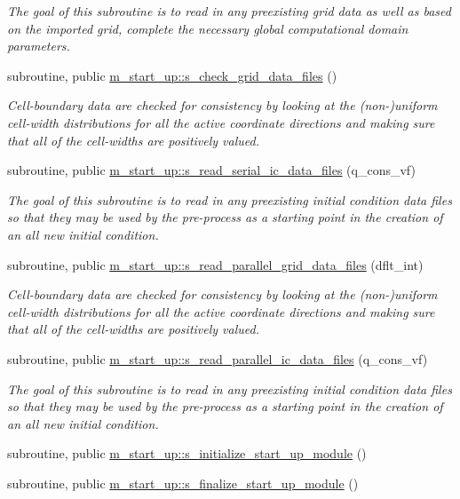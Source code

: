 \begin{DoxyCompactItemize}
\begin{DoxyCompactList}\small\item\em The goal of this subroutine is to read in any preexisting grid data as well as based on the imported grid, complete the necessary global computational domain parameters. \end{DoxyCompactList}\item 
subroutine, public \hyperlink{namespacem__start__up_a1d2e9e9354b18d2aab09e673b04032ef}{m\+\_\+start\+\_\+up\+::s\+\_\+check\+\_\+grid\+\_\+data\+\_\+files} ()
\begin{DoxyCompactList}\small\item\em Cell-\/boundary data are checked for consistency by looking at the (non-\/)uniform cell-\/width distributions for all the active coordinate directions and making sure that all of the cell-\/widths are positively valued. \end{DoxyCompactList}\item 
subroutine, public \hyperlink{namespacem__start__up_a88f1f355d8aeecb6cd47653ed285cfa2}{m\+\_\+start\+\_\+up\+::s\+\_\+read\+\_\+serial\+\_\+ic\+\_\+data\+\_\+files} (q\+\_\+cons\+\_\+vf)
\begin{DoxyCompactList}\small\item\em The goal of this subroutine is to read in any preexisting initial condition data files so that they may be used by the pre-\/process as a starting point in the creation of an all new initial condition. \end{DoxyCompactList}\item 
subroutine, public \hyperlink{namespacem__start__up_aaaad3d18eef01d1d8387e34a8b7d33ac}{m\+\_\+start\+\_\+up\+::s\+\_\+read\+\_\+parallel\+\_\+grid\+\_\+data\+\_\+files} (dflt\+\_\+int)
\begin{DoxyCompactList}\small\item\em Cell-\/boundary data are checked for consistency by looking at the (non-\/)uniform cell-\/width distributions for all the active coordinate directions and making sure that all of the cell-\/widths are positively valued. \end{DoxyCompactList}\item 
subroutine, public \hyperlink{namespacem__start__up_a25daee88d75c57908efa6e3e0516fb28}{m\+\_\+start\+\_\+up\+::s\+\_\+read\+\_\+parallel\+\_\+ic\+\_\+data\+\_\+files} (q\+\_\+cons\+\_\+vf)
\begin{DoxyCompactList}\small\item\em The goal of this subroutine is to read in any preexisting initial condition data files so that they may be used by the pre-\/process as a starting point in the creation of an all new initial condition. \end{DoxyCompactList}\item 
subroutine, public \hyperlink{namespacem__start__up_a37202711d89d04cd18f08170ba608aa1}{m\+\_\+start\+\_\+up\+::s\+\_\+initialize\+\_\+start\+\_\+up\+\_\+module} ()
\item 
subroutine, public \hyperlink{namespacem__start__up_a65fd279db64882a3732a0549ec74e335}{m\+\_\+start\+\_\+up\+::s\+\_\+finalize\+\_\+start\+\_\+up\+\_\+module} ()
\end{DoxyCompactItemize}
